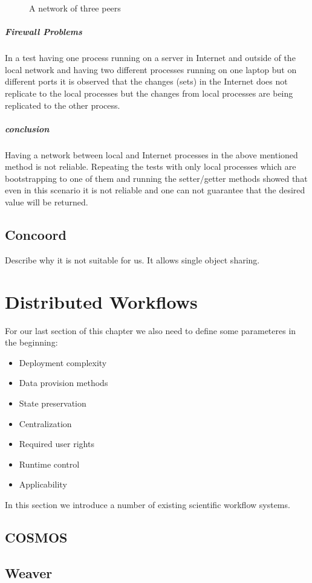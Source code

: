 \begin{figure}
\centering
{}
\caption{A network of three peers}
\label{fig:threepeers}
\end{figure}


\subparagraph{Firewall Problems}
In a test having one process running on a server in Internet and outside of the local network and having two
different processes running on one laptop but on different ports it is observed that the changes (sets) in the
Internet does not replicate to the local processes but the changes from local processes are being replicated to the other process.

\subparagraph{conclusion}
Having a network between local and Internet processes in the above mentioned method is not reliable. 
Repeating the tests with only local processes which are bootstrapping to one of them and running the setter/getter
methods showed that even in this scenario it is not reliable and one can not guarantee that the desired value will be returned.


\subsection{Concoord}
Describe why it is not suitable for us. It allows single object sharing.

\section{Distributed Workflows}
For our last section of this chapter we also need to define some parameteres in the beginning:
\begin{itemize}
\item Deployment complexity
\item Data provision methods
\item State preservation
\item Centralization
\item Required user rights
\item Runtime control
\item Applicability
\end{itemize}

In this section we introduce a number of existing scientific workflow systems.
\subsection{COSMOS}\cite{Gafni30062014}
\subsection{Weaver}\cite{Bui_weaver:integrating}